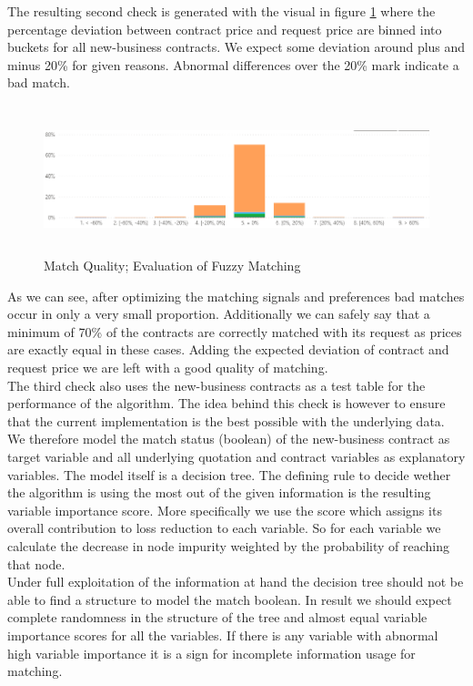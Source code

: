 \documentclass[12pt,titlepage]{article}
\begin{document}
The resulting second check is generated with the visual in figure \ref{fig:matchquality} where the percentage deviation between contract price and request price are binned into buckets for all new-business contracts. We expect some deviation around plus and minus 20\% for given reasons. Abnormal differences over the 20\% mark indicate a bad match. \\
\begin{figure}[H]
    \centerline{\includegraphics[height=4.3cm]{quality.png}}
\caption{Match Quality; Evaluation of Fuzzy Matching}
\label{fig:matchquality}
\end{figure}
\noindent
As we can see, after optimizing the matching signals and preferences bad matches occur in only a very small proportion. Additionally we can safely say that a minimum of 70\% of the contracts are correctly matched with its request as prices are exactly equal in these cases. Adding the expected deviation of contract and request price we are left with a good quality of matching.\\
The third check also uses the new-business contracts as a test table for the performance of the algorithm. The idea behind this check is however to ensure that the current implementation is the best possible with the underlying data. \\
We therefore model the match status (boolean) of the new-business contract as target variable and all underlying quotation and contract variables as explanatory variables. The model itself is a decision tree. The defining rule to decide wether the algorithm is using the most out of the given information is the resulting variable importance score. More specifically we use the score which assigns its overall contribution to loss reduction to each variable. So for each variable we calculate the decrease in node impurity weighted by the probability of reaching that node.\\
Under full exploitation of the information at hand the decision tree should not be able to find a structure to model the match boolean. In result we should expect complete randomness in the structure of the tree and almost equal variable importance scores for all the variables. If there is any variable with abnormal high variable importance it is a sign for incomplete information usage for matching. \\
\end{document}
